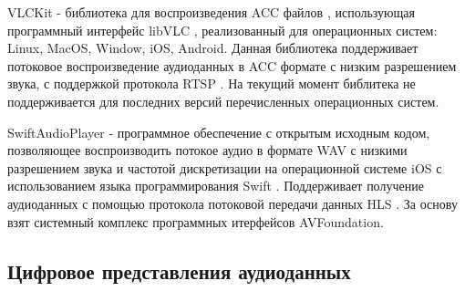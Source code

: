 	\par VLCKit \cite{VLCKit} - библиотека для воспроизведения ACC файлов \cite{acc}, использующая программный интерфейс libVLC \cite{libVLC}, 
	реализованный для операционных систем: Linux, MacOS, Window, iOS, Android. 
	Данная библиотека поддерживает потоковое воспроизведение аудиоданных в ACC формате с низким разрешением звука, 
	с поддержкой протокола RTSP \cite{rtsp}.
	На текущий момент библитека не поддерживается для последних версий перечисленных операционных систем.
	
	\par SwiftAudioPlayer \cite{SwiftAudioPlayer} - программное обеспечение с открытым исходным кодом, 
	позволяющее воспроизводить потокое аудио в формате WAV \cite{wave-audio}
	с низкими разрешением звука и частотой дискретизации на операционной системе iOS 
	с использованием языка программирования Swift \cite{swift}.
	Поддерживает получение аудиоданных с помощью протокола потоковой передачи данных HLS \cite{hls}.
	За основу взят системный комплекс программных итерфейсов AVFoundation. 
	

\subsection{Цифровое представления аудиоданных}


	
